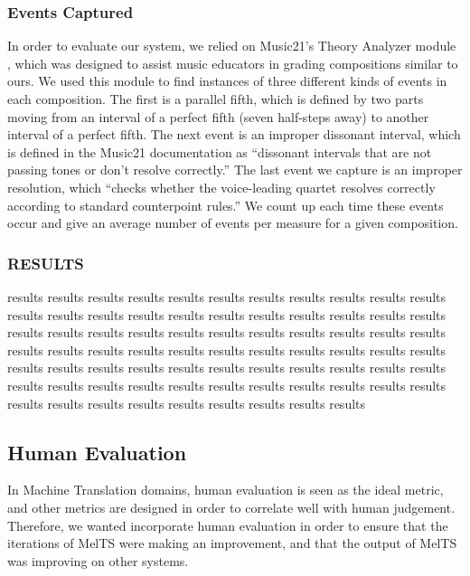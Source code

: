 \documentclass{sig-alternate}
\begin{document}
\subsubsection{Events Captured}
In order to evaluate our system, we relied on Music21's Theory Analyzer module \cite{Cuthbert_music21:a}, which was designed to assist music educators in grading compositions similar to ours. We used this module to find instances of three different kinds of events in each composition. The first is a parallel fifth, which is defined by two parts moving from an interval of a perfect fifth (seven half-steps away) to another interval of a perfect fifth. The next event is an improper dissonant interval, which is defined in the Music21 documentation as ``dissonant intervals that are not passing tones or don't resolve correctly.'' The last event we capture is an improper resolution, which ``checks whether the voice-leading quartet resolves correctly according to standard counterpoint rules.'' We count up each time these events occur and give an average number of events per measure for a given composition. 

\subsubsection{RESULTS}

results results results results results results results results results results results results results results results results results results results results results results results results results results results results results results results results results results results results results results results results results results results results results results results results results results results results results results results results results results results results results results results results results results results results results results results results results results results 

\subsection{Human Evaluation}
In Machine Translation domains, human evaluation is seen as the ideal metric, and other metrics are designed in order to correlate well with human judgement. Therefore, we wanted incorporate human evaluation in order to ensure that the iterations of MelTS were making an improvement, and that the output of MelTS was improving on other systems.
\end{document}
